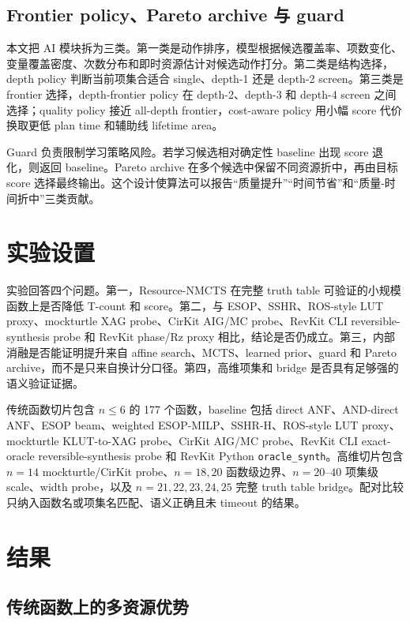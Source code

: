 \documentclass[UTF8,fontset=macnew,11pt]{ctexart}
\newcommand{\method}{Resource-NMCTS}
\newcommand{\anf}{\ensuremath{\mathrm{ANF}}}
\newcommand{\mcts}{\ensuremath{\mathrm{MCTS}}}
\newcommand{\ttable}{truth table}
\begin{document}
\subsection{Frontier policy、Pareto archive 与 guard}

本文把 AI 模块拆为三类。第一类是动作排序，模型根据候选覆盖率、项数变化、变量覆盖密度、次数分布和即时资源估计对候选动作打分。第二类是结构选择，depth policy 判断当前项集合适合 single、depth-1 还是 depth-2 screen。第三类是 frontier 选择，depth-frontier policy 在 depth-2、depth-3 和 depth-4 screen 之间选择；quality policy 接近 all-depth frontier，cost-aware policy 用小幅 score 代价换取更低 plan time 和辅助线 lifetime area。

Guard 负责限制学习策略风险。若学习候选相对确定性 baseline 出现 score 退化，则返回 baseline。Pareto archive 在多个候选中保留不同资源折中，再由目标 score 选择最终输出。这个设计使算法可以报告“质量提升”“时间节省”和“质量-时间折中”三类贡献。

\section{实验设置}

实验回答四个问题。第一，\method{} 在完整 \ttable{} 可验证的小规模函数上是否降低 T-count 和 score。第二，与 ESOP、SSHR、ROS-style LUT proxy、mockturtle XAG probe、CirKit AIG/MC probe、RevKit CLI reversible-synthesis probe 和 RevKit phase/Rz proxy 相比，结论是否仍成立。第三，内部消融是否能证明提升来自 affine search、\mcts{}、learned prior、guard 和 Pareto archive，而不是只来自换计分口径。第四，高维项集和 bridge 是否具有足够强的语义验证证据。

传统函数切片包含 $n\leq6$ 的 177 个函数，baseline 包括 direct \anf{}、AND-direct \anf{}、ESOP beam、weighted ESOP-MILP、SSHR-H、ROS-style LUT proxy、mockturtle KLUT-to-XAG probe、CirKit AIG/MC probe、RevKit CLI exact-oracle reversible-synthesis probe 和 RevKit Python \texttt{oracle\_synth}。高维切片包含 $n=14$ mockturtle/CirKit probe、$n=18,20$ 函数级边界、$n=20$--$40$ 项集级 scale、width probe，以及 $n=21,22,23,24,25$ 完整 \ttable{} bridge。配对比较只纳入函数名或项集名匹配、语义正确且未 timeout 的结果。

\section{结果}

\subsection{传统函数上的多资源优势}
\end{document}
